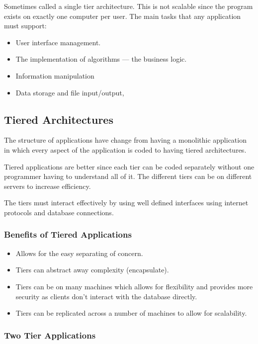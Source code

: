 Sometimes called a single tier architecture.
This is not scalable since the program exists on exactly one computer per user.
The main tasks that any application must support:
\begin{itemize}
    \item User interface management.
    \item The implementation of algorithms --- the business logic.
    \item Information manipulation
    \item Data storage and file input/output,
\end{itemize}

\subsection{Tiered Architectures}\label{sub:tiered_architecutures}

The structure of applications have change from having a monolithic application in which every aspect of the application is coded to having tiered architectures.

Tiered applications are better since each tier can be coded separately without one programmer having to understand all of it.
The different tiers can be on different servers to increase efficiency.

The tiers must interact effectively by using well defined interfaces using internet protocols and database connections.

\subsubsection{Benefits of Tiered Applications}\label{ssub:benefits_of_tiered_applications}

\begin{itemize}
    \item Allows for the easy separating of concern.
    \item Tiers can abstract away complexity (encapsulate).
    \item Tiers can be on many machines which allows for flexibility and provides more security as clients don't interact with the database directly.
    \item Tiers can be replicated across a number of machines to allow for scalability.
\end{itemize}

\subsubsection{Two Tier Applications}\label{ssub:two_tier_applications}

